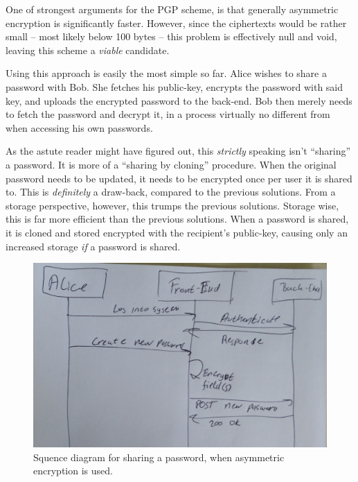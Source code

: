 				One of strongest arguments for the PGP scheme, is that generally asymmetric encryption is significantly faster. However, since the ciphertexts would be rather small -- most likely below 100 bytes -- this problem is effectively null and void, leaving this scheme a \emph{viable} candidate.

				Using this approach is easily the most simple so far. Alice wishes to share a password with Bob. She fetches his public-key, encrypts the password with said key, and uploads the encrypted password to the back-end. Bob then merely needs to fetch the password and decrypt it, in a process virtually no different from when accessing his own passwords.

				As the astute reader might have figured out, this \emph{strictly} speaking isn't ``sharing'' a password. It is more of a ``sharing by cloning'' procedure. When the original password needs to be updated, it needs to be encrypted once per user it is shared to. This is \emph{definitely} a draw-back, compared to the previous solutions. From a storage perspective, however, this trumps the previous solutions. Storage wise, this is far more efficient than the previous solutions. When a password is shared, it is cloned and stored encrypted with the recipient's public-key, causing only an increased storage \emph{if} a password is shared.

				\begin{figure}[h!]
					\centering
					\includegraphics[width=\textwidth]{figures/design/sequence_perEntry.png}
					\caption{Squence diagram for sharing a password, when asymmetric encryption is used.}
					\label{fig:sequence:asymmetric}
				\end{figure}



